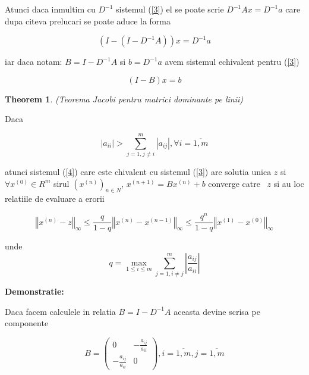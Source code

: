 \documentclass[a4paper,twoside]{book}
\newtheorem{theorem}{Theorem}
\begin{document}
Atunci daca inmultim cu \thinspace $D^{-1}$ sistemul (\ref{3}) el se poate
scrie $D^{-1}Ax=D^{-1}a$ care dupa citeva prelucari se poate aduce la forma

\begin{equation*}
(I-(I-D^{-1}A))x=D^{-1}a
\end{equation*}

iar daca notam: $B=I-D^{-1}A$ si $b=D^{-1}a$ avem sistemul echivalent pentru
(\ref{3})

\begin{equation}
(I-B)x=b  \label{4}
\end{equation}

\begin{theorem}
\label{Jacobirow} (Teorema Jacobi pentru matrici dominante pe linii)
\end{theorem}

Daca

\begin{equation}
\left\vert a_{ii}\right\vert >\sum_{j=1,j\neq i}^{m}\left\vert
a_{ij}\right\vert ,\forall i=\overline{1,m}  \label{5}
\end{equation}

atunci sistemul (\ref{4}) care este chivalent cu sistemul (\ref{3}) are
solutia unica $z$ si $\forall x^{(0)}\in R^{m}$ sirul $(x^{(n)})_{n\in N}$, $%
x^{(n+1)}=Bx^{(n)}+b$ converge catre \ $z$ si au loc relatiile de evaluare a
erorii

\begin{equation}
\left\Vert x^{(n)}-z\right\Vert _{\infty }\leq \frac{q}{1-q}\left\Vert
x^{(n)}-x^{(n-1)}\right\Vert _{\infty }\leq \frac{q^{n}}{1-q}\left\Vert
x^{(1)}-x^{(0)}\right\Vert _{\infty }  \label{6}
\end{equation}

unde 
\begin{equation*}
q=\max_{1\leq i\leq m}\sum_{j=1,i\neq j}^{m}\left\vert \frac{a_{ij}}{a_{ii}}%
\right\vert
\end{equation*}

\textbf{Demonstratie:}

Daca facem calculele in relatia $B=I-D^{-1}A$ aceasta devine scrisa pe
componente

\begin{equation*}
B=\left( 
\begin{array}{cc}
0 & -\frac{a_{ij}}{a_{ii}} \\ 
-\frac{a_{ij}}{a_{ii}} & 0%
\end{array}%
\right) ,i=\overline{1,m},j=\overline{1,m}
\end{equation*}
\end{document}
